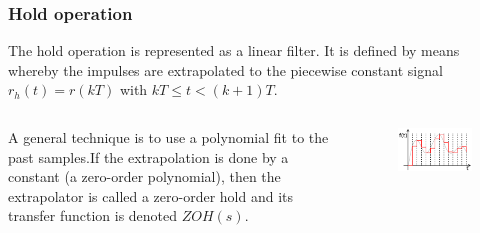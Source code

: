 \begin{frame}
	\frametitle{Hold operation}
	\begin{block}{}
	The hold operation is represented as a linear filter. It is defined by means whereby the impulses are extrapolated to the piecewise constant signal $r_h(t) = r(kT)$ with $kT \leq t < (k+1)T$.\\
	\end{block}
	\vspace{1em}
	\begin{columns}
		\begin{column}{0.5\textwidth}
		A general technique is to use a polynomial fit to the past samples.If the extrapolation is done by a constant (a zero-order polynomial), then the extrapolator is called a zero-order hold and its transfer function is denoted $ZOH(s)$. 
		\end{column}
		\begin{column}{0.5\textwidth}
		\begin{figure}
			\includegraphics[width=1\linewidth]{sample_and_hold}
		\end{figure}	
		\end{column}	
	\end{columns}
\end{frame}

